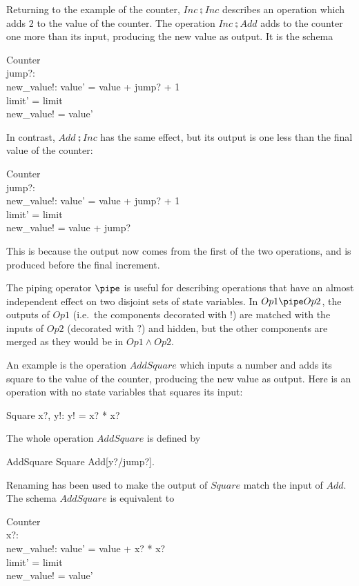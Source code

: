 Returning to the %
example of the counter, $Inc \semi Inc$ describes an operation which
adds 2 to the value of the counter. The operation $Inc \semi Add$
adds to the counter one more than its input, producing the new value
as output. It is the schema
\begin{schema*}
	\Delta Counter \\
	jump?: \nat \\
	new\_value!: \nat
\where
	value' = value + jump? + 1 \\
	limit' = limit \\
	new\_value! = value'
\end{schema*}
In contrast, $Add \semi Inc$ has the same effect, but its output is
one less than the final value of the counter:
\begin{schema*}
	\Delta Counter \\
	jump?: \nat \\
	new\_value!: \nat
\where
	value' = value + jump? + 1 \\
	limit' = limit \\
	new\_value! = value + jump?
\end{schema*}
This is because the output now comes from the first of the two
operations, and is produced before the final increment.

The piping operator $\pipe$ is useful for describing operations that
have an almost independent effect on two disjoint sets of state
variables.  In $Op1 \pipe Op2$, the outputs of $Op1$ (i.e.\ the
components decorated with $!$) are matched with the inputs of $Op2$
(decorated with $?$) and hidden, but the other components are merged
as they would be in $Op1 \land Op2$.

An example is the operation $AddSquare$ which inputs a number and
adds its square to the value of the counter, producing the new value
as output.  Here is an operation with no state variables that squares
its input:
\begin{schema}{Square}
	x?, y!: \nat
\where
	y! = x? * x?
\end{schema}
The whole operation $AddSquare$ is defined by
\begin{zed}
	AddSquare  Square \pipe Add[y?/jump?].
\end{zed}
Renaming has been used to make the output of $Square$ match the
input of $Add$.  The schema $AddSquare$ is equivalent to
\begin{schema*}
	\Delta Counter \\
	x?: \nat \\
	new\_value!: \nat
\where
	value' = value + x? * x? \\
	limit' = limit \\
	new\_value! = value'
\end{schema*}

